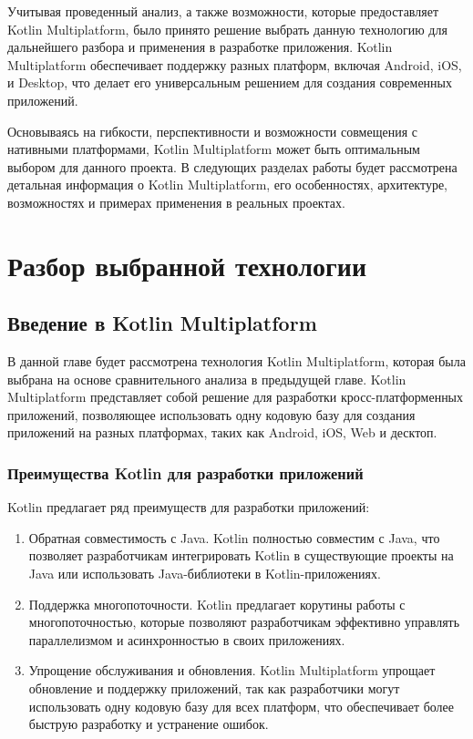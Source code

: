 \documentclass[14pt, russian]{scrartcl}
\begin{document}
Учитывая проведенный анализ, а также возможности, которые предоставляет Kotlin Multiplatform, было принято решение выбрать данную технологию для дальнейшего разбора и применения в разработке приложения. Kotlin Multiplatform обеспечивает поддержку разных платформ, включая Android, iOS, и Desktop, что делает его универсальным решением для создания современных приложений. 

Основываясь на гибкости, перспективности и возможности совмещения с нативными платформами, Kotlin Multiplatform может быть оптимальным выбором для данного проекта. В следующих разделах работы будет рассмотрена детальная информация о Kotlin Multiplatform, его особенностях, архитектуре, возможностях и примерах применения в реальных проектах.

\section{Разбор выбранной технологии}\label{Sect::kotlinmp}

\subsection{Введение в Kotlin Multiplatform}

В данной главе будет рассмотрена технология Kotlin Multiplatform, которая была выбрана на основе сравнительного анализа в предыдущей главе. Kotlin Multiplatform представляет собой решение для разработки кросс-платформенных приложений, позволяющее использовать одну кодовую базу для создания приложений на разных платформах, таких как Android, iOS, Web и десктоп.

\subsubsection{Преимущества Kotlin для разработки приложений}

Kotlin предлагает ряд преимуществ для разработки приложений:
\begin{enumerate}
    \item Обратная совместимость с Java. Kotlin полностью совместим с Java, что позволяет разработчикам интегрировать Kotlin в существующие проекты на Java или использовать Java-библиотеки в Kotlin-приложениях.
    \item Поддержка многопоточности. Kotlin предлагает корутины работы с многопоточностью, которые позволяют разработчикам эффективно управлять параллелизмом и асинхронностью в своих приложениях.
    \item Упрощение обслуживания и обновления. Kotlin Multiplatform упрощает обновление и поддержку приложений, так как разработчики могут использовать одну кодовую базу для всех платформ, что обеспечивает более быструю разработку и устранение ошибок.
\end{enumerate}
\end{document}
